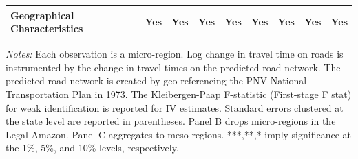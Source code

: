 \begin{table}[p]
{{\begin{tabular}{l*{8}{c}}
Geographical Characteristics&         Yes         &         Yes         &         Yes         &         Yes         &         Yes         &         Yes         &         Yes         &         Yes         \\
\hline\hline
\end{tabular}}
}
\usebox{\tabbox}
\begin{minipage}{\wd\tabbox}
    \vspace{0.1cm}
    {\footnotesize \sloppy \textit{Notes: } Each observation is a micro-region. Log change in travel time on roads is instrumented by the change in travel times on the predicted road network. The predicted road network is created by geo-referencing the PNV National Transportation Plan in 1973. The Kleibergen-Paap F-statistic (First-stage F stat) for weak identification is reported for IV estimates. Standard errors clustered at the state level are reported in parentheses. Panel B drops micro-regions in the Legal Amazon. Panel C aggregates to meso-regions. ***,**,* imply significance at the 1\%, 5\%, and 10\% levels, respectively.}
\end{minipage}
\endgroup
\end{table}
